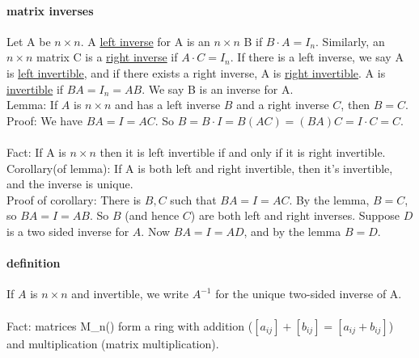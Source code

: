 \documentclass[10pt,letter]{article}
\begin{document}
\paragraph{matrix inverses}
Let A be $n\times n$. A \underline{left inverse} for A is an $n\times n$ B if $B\cdot A=I_n$. Similarly, an $n\times n$ matrix C is a \underline{right inverse} if $A\cdot C=I_n$. If there is a left inverse, we say A is \underline{left invertible}, and if there exists a right inverse, A is \underline{right invertible}. A is \underline{invertible} if $BA=I_n=AB$. We say B is an inverse for A. \\ 
Lemma: If $A$ is $n\times n$ and has a left inverse $B$ and a right inverse $C$, then $B=C$. \\ 
Proof: We have $BA = I = AC$. So $B=B\cdot I=B(AC)=(BA)C=I\cdot C = C$. \\ \\ 
Fact: If A is $n\times n$ then it is left invertible if and only if it is right invertible. \\ 
Corollary(of lemma): If A is both left and right invertible, then it's invertible, and the inverse is unique. \\ 
Proof of corollary: There is $B,C$ such that $BA=I=AC$. By the lemma, $B=C$, so $BA=I=AB$. So $B$ (and hence $C$) are both left and right inverses. Suppose $D$ is a two sided inverse for $A$. Now $BA=I=AD$, and by the lemma $B=D$. 

\paragraph{definition}
If $A$ is $n\times n$ and invertible, we write $A^{-1}$ for the unique two-sided inverse of A. \\ \\ 
Fact: matrices M_{n}() form a ring with addition ($[a_{ij}]+[b_{ij}]=[a_{ij}+b_{ij}]$) and multiplication (matrix multiplication). 
\end{document}
